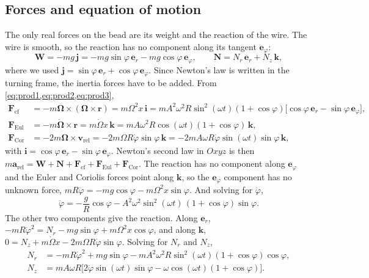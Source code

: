 \documentclass[11pt,a4paper]{article}
\newcommand{\dt}[1]{\dot{#1}}
\newcommand{\ddt}[1]{\ddot{#1}}
\newcommand{\er}{\bm{e}_r}
\newcommand{\ephi}{\bm{e}_\varphi}
\newcommand{\ii}{\bm{i}}
\newcommand{\jj}{\bm{j}}
\newcommand{\kk}{\bm{k}}
\begin{document}
\subsection{Forces and equation of motion}
The only real forces on the bead are its weight and the reaction of the wire. The wire is smooth, so the reaction has no component along its tangent $\ephi$:
\begin{equation}
\bm W=-mg\,\jj=-mg\sin\varphi\,\er-mg\cos\varphi\,\ephi,\qquad \bm N=N_r\,\er+N_z\,\kk ,
\label{eq:forces}
\end{equation}
where we used $\jj=\sin\varphi\,\er+\cos\varphi\,\ephi$. Since Newton's law is written in the turning frame, the inertia forces have to be added. From \cref{eq:prod1,eq:prod2,eq:prod3},
\begin{align}
\bm F_{\text{cf}}&=-m\bm\Omega\times(\bm\Omega\times\bm r)=m\Omega^2x\,\ii=mA^2\omega^2R\sin^2(\omega t)(1+\cos\varphi)\big[\cos\varphi\,\er-\sin\varphi\,\ephi\big],\label{eq:Fcf}\\
\bm F_{\text{Eul}}&=-m\dt{\bm\Omega}\times\bm r=m\dt\Omega x\,\kk=mA\omega^2R\cos(\omega t)(1+\cos\varphi)\,\kk,\label{eq:Feul}\\
\bm F_{\text{Cor}}&=-2m\bm\Omega\times\bm v_{\text{rel}}=-2m\Omega R\dt\varphi\sin\varphi\,\kk=-2mA\omega R\dt\varphi\sin(\omega t)\sin\varphi\,\kk ,\label{eq:Fcor}
\end{align}
with $\ii=\cos\varphi\,\er-\sin\varphi\,\ephi$. Newton's second law in $Oxyz$ is then $m\bm a_{\text{rel}}=\bm W+\bm N+\bm F_{\text{cf}}+\bm F_{\text{Eul}}+\bm F_{\text{Cor}}$. The reaction has no component along $\ephi$ and the Euler and Coriolis forces point along $\kk$, so the $\ephi$ component has no unknown force, $mR\ddt\varphi=-mg\cos\varphi-m\Omega^2x\sin\varphi$. And solving for $\ddt\varphi$,
\begin{equation}
\ddt\varphi=-\frac{g}{R}\cos\varphi-A^2\omega^2\sin^2(\omega t)\,(1+\cos\varphi)\sin\varphi .
\label{eq:eom}
\end{equation}
The other two components give the reaction. Along $\er$, $-mR\dt\varphi^2=N_r-mg\sin\varphi+m\Omega^2x\cos\varphi$, and along $\kk$, $0=N_z+m\dt\Omega x-2m\Omega R\dt\varphi\sin\varphi$. Solving for $N_r$ and $N_z$,
\begin{align}
N_r&=-mR\dt\varphi^2+mg\sin\varphi-mA^2\omega^2R\sin^2(\omega t)(1+\cos\varphi)\cos\varphi ,\label{eq:Nr}\\
N_z&=mA\omega R\big[2\dt\varphi\sin(\omega t)\sin\varphi-\omega\cos(\omega t)(1+\cos\varphi)\big].\label{eq:Nz}
\end{align}
\end{document}
